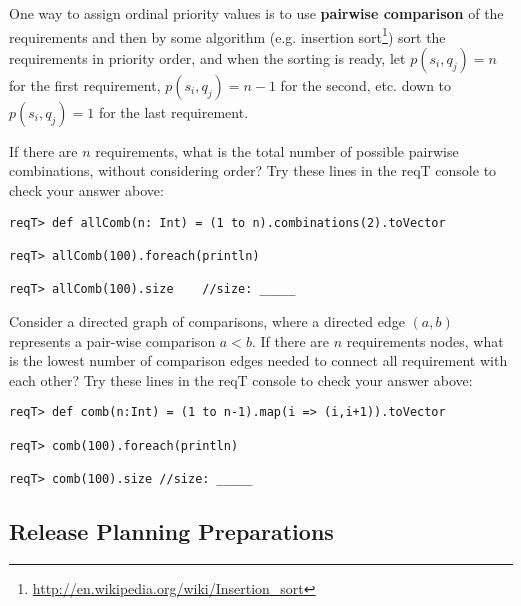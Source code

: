 \documentclass[11pt]{article}
\begin{document}
One way to assign ordinal priority values is to use {\bf pairwise comparison} of the requirements and then by some algorithm (e.g. insertion sort\footnote{\url{http://en.wikipedia.org/wiki/Insertion_sort}}) sort the requirements in priority order, and when the sorting is ready, let $p(s_i, q_j) = n$ for the first requirement,  $p(s_i, q_j) = n - 1$ for the second, etc. down to $p(s_i, q_j) = 1$ for the last requirement. 


\begin{framed}
\noindent 
If there are $n$ requirements, what is the total number of possible pairwise combinations, without considering order? 
\newline\newline   \underline{\hspace{11cm}}
\newline\newline Try these lines in the reqT console to check your answer above:

{\scriptsize\begin{verbatim}
reqT> def allComb(n: Int) = (1 to n).combinations(2).toVector

reqT> allComb(100).foreach(println)    

reqT> allComb(100).size    //size: _____ 
\end{verbatim}}

\noindent
Consider a directed graph of comparisons, where a directed edge $(a,b)$ represents a pair-wise comparison $a < b$. If there are $n$ requirements nodes, what is the lowest number of comparison edges needed to connect all requirement with each other? 
\newline\newline   \underline{\hspace{11cm}}
\newline\newline Try these lines in the reqT console to check your answer above:

{\scriptsize\begin{verbatim}
reqT> def comb(n:Int) = (1 to n-1).map(i => (i,i+1)).toVector        

reqT> comb(100).foreach(println)    

reqT> comb(100).size //size: _____ 
\end{verbatim}}
 \end{framed}




\subsection{Release Planning Preparations}
\end{document}
